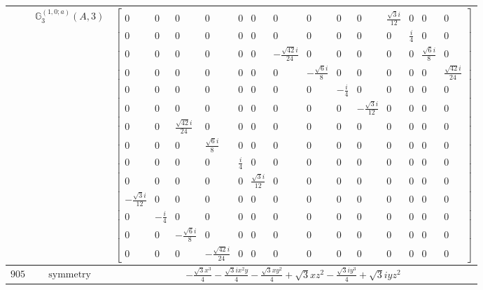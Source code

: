 \documentclass[fleqn,8pt,landscape]{jsarticle}
\begin{document}
\begin{longtable}{ccc}
$  $ & $ \mathbb{G}_{3}^{(1,0;a)}(A,3) $ & $ \begin{bmatrix} 0 & 0 & 0 & 0 & 0 & 0 & 0 & 0 & 0 & 0 & \frac{\sqrt{3} i}{12} & 0 & 0 & 0 \\ 0 & 0 & 0 & 0 & 0 & 0 & 0 & 0 & 0 & 0 & 0 & \frac{i}{4} & 0 & 0 \\ 0 & 0 & 0 & 0 & 0 & 0 & - \frac{\sqrt{42} i}{24} & 0 & 0 & 0 & 0 & 0 & \frac{\sqrt{6} i}{8} & 0 \\ 0 & 0 & 0 & 0 & 0 & 0 & 0 & - \frac{\sqrt{6} i}{8} & 0 & 0 & 0 & 0 & 0 & \frac{\sqrt{42} i}{24} \\ 0 & 0 & 0 & 0 & 0 & 0 & 0 & 0 & - \frac{i}{4} & 0 & 0 & 0 & 0 & 0 \\ 0 & 0 & 0 & 0 & 0 & 0 & 0 & 0 & 0 & - \frac{\sqrt{3} i}{12} & 0 & 0 & 0 & 0 \\ 0 & 0 & \frac{\sqrt{42} i}{24} & 0 & 0 & 0 & 0 & 0 & 0 & 0 & 0 & 0 & 0 & 0 \\ 0 & 0 & 0 & \frac{\sqrt{6} i}{8} & 0 & 0 & 0 & 0 & 0 & 0 & 0 & 0 & 0 & 0 \\ 0 & 0 & 0 & 0 & \frac{i}{4} & 0 & 0 & 0 & 0 & 0 & 0 & 0 & 0 & 0 \\ 0 & 0 & 0 & 0 & 0 & \frac{\sqrt{3} i}{12} & 0 & 0 & 0 & 0 & 0 & 0 & 0 & 0 \\ - \frac{\sqrt{3} i}{12} & 0 & 0 & 0 & 0 & 0 & 0 & 0 & 0 & 0 & 0 & 0 & 0 & 0 \\ 0 & - \frac{i}{4} & 0 & 0 & 0 & 0 & 0 & 0 & 0 & 0 & 0 & 0 & 0 & 0 \\ 0 & 0 & - \frac{\sqrt{6} i}{8} & 0 & 0 & 0 & 0 & 0 & 0 & 0 & 0 & 0 & 0 & 0 \\ 0 & 0 & 0 & - \frac{\sqrt{42} i}{24} & 0 & 0 & 0 & 0 & 0 & 0 & 0 & 0 & 0 & 0 \end{bmatrix} $ \\ \hline
$ 905 $ & $ \text{symmetry} $ & $ - \frac{\sqrt{3} x^{3}}{4} - \frac{\sqrt{3} i x^{2} y}{4} - \frac{\sqrt{3} x y^{2}}{4} + \sqrt{3} x z^{2} - \frac{\sqrt{3} i y^{3}}{4} + \sqrt{3} i y z^{2} $ \\

\end{longtable}
\end{document}
